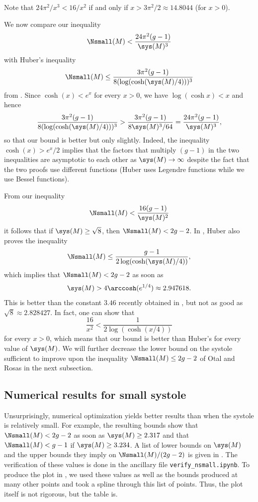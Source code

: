 \documentclass[12pt]{amsart}
\numberwithin{equation}{section}
\begin{document}
\begin{rem}
Note that $24\pi^2 / x^3 < 16 / x^2$ if and only if $x>3\pi^2 / 2 \approx 14.8044$ (for $x>0$).
\end{rem}

We now compare our inequality
\[
\Nsmall(M) < \frac{24\pi^2(g-1)}{\sys(M)^3}
\]
with Huber's inequality
\[
\Nsmall(M) \leq \frac{3\pi^2 (g-1)}{8(\log (\cosh(\sys(M)/4)))^3}
\]
from \cite{HuberSmallEigs}. Since $\cosh(x) < e^x$ for every $x> 0$, we have $ \log( \cosh x) < x$ and hence
\[
\frac{3\pi^2 (g-1)}{8(\log (\cosh(\sys(M)/4)))^3} > \frac{3\pi^2 (g-1)}{8\sys(M)^3 / 64} = \frac{24\pi^2(g-1)}{\sys(M)^3},
\]
so that our bound is better but only slightly. Indeed, the inequality $\cosh(x) > e^x / 2$ implies that the factors that multiply $(g-1)$ in the two inequalities are asymptotic to each other as $\sys(M) \to \infty$ despite the fact that the two proofs use different functions (Huber uses Legendre functions while we use Bessel functions).

From our inequality
\[
\Nsmall(M) < \frac{16(g-1)}{\sys(M)^2}
\]
it follows that if $\sys(M)\geq \sqrt{8}$, then $\Nsmall(M)<2g-2$. In \cite{HuberSmallEigs}, Huber also proves the inequality
\[
\Nsmall(M) \leq \frac{g-1}{2 \log (\cosh(\sys(M)/4))},
\]  
which implies that $\Nsmall(M) < 2g-2$ as soon as 
\[\sys(M) > 4\arccosh(e^{1/4})\approx 2.947618.\]
This is better than the constant $3.46$ recently obtained in \cite{Jammes}, but not as good as $\sqrt{8} \approx 2.828427$. In fact, one can show that
\[
\frac{16}{x^2} < \frac{1}{2\log(\cosh(x/4))}
\]
for every $x>0$, which means that our bound is better than Huber's for every value of $\sys(M)$. We will further decrease the lower bound on the systole sufficient to improve upon the inequality $\Nsmall(M) \leq 2g-2$ of Otal and Rosas in the next subsection.

\subsection{Numerical results for small systole}

Unsurprisingly, numerical optimization yields better results than  when the systole is relatively small. For example, the resulting bounds show that $\Nsmall(M)<2g-2$ as soon as $\sys(M)\geq 2.317$ and that $\Nsmall(M)<g-1$ if $\sys(M) \geq 3.234$. A list of lower bounds on $\sys(M)$ and the upper bounds they imply on $\Nsmall(M)/(2g-2)$ is given in . The verification of these values is done in the ancillary file \texttt{verify\_nsmall.ipynb}. To produce the plot in , we used these values as well as the bounds produced at many other points and took a spline through this list of points. Thus, the plot itself is not rigorous, but the table is.
\end{document}
